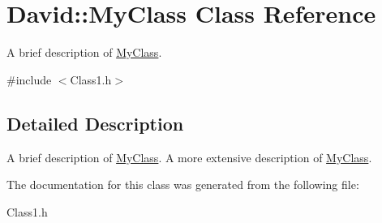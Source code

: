\hypertarget{classDavid_1_1MyClass}{
\section{David::MyClass Class Reference}
\label{classDavid_1_1MyClass}
}


A brief description of \hyperlink{classDavid_1_1MyClass}{MyClass}.  




{\ttfamily \#include $<$Class1.h$>$}



\subsection{Detailed Description}
A brief description of \hyperlink{classDavid_1_1MyClass}{MyClass}. A more extensive description of \hyperlink{classDavid_1_1MyClass}{MyClass}. 

The documentation for this class was generated from the following file:\begin{DoxyCompactItemize}
\item 
Class1.h\end{DoxyCompactItemize}
